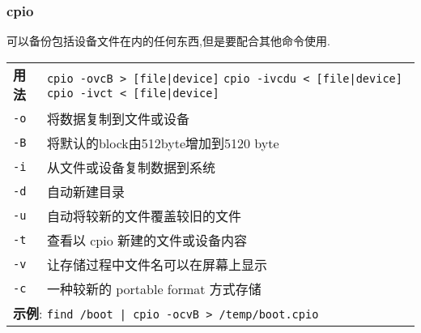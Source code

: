 \subsubsection{cpio}
可以备份包括设备文件在内的任何东西,但是要配合其他命令使用.
\begin{longtable}{l@{ : }p{}}\hline\hline

    \textbf{用法} & \verb"cpio -ovcB > [file|device]"  \newline
                    \verb"cpio -ivcdu < [file|device]" \newline
                    \verb"cpio -ivct < [file|device]"
    \\

    \texttt{-o} & 将数据复制到文件或设备\\

    \texttt{-B} & 将默认的block由512byte增加到5120
    byte\\

    \texttt{-i} & 从文件或设备复制数据到系统\\

    \texttt{-d} & 自动新建目录\\

    \texttt{-u} & 自动将较新的文件覆盖较旧的文件\\

    \texttt{-t} & 查看以 cpio 新建的文件或设备内容\\

    \texttt{-v} & 让存储过程中文件名可以在屏幕上显示\\

    \texttt{-c} & 一种较新的 portable format 方式存储\\

    \multicolumn{2}{l}{ \textbf{示例}: \texttt{find /boot | cpio -ocvB > /temp/boot.cpio}}\\

    \hline
\end{longtable} 